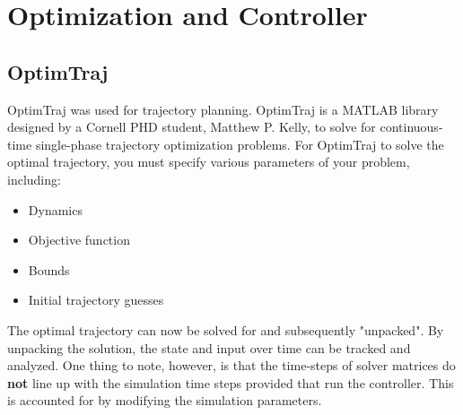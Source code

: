 \documentclass[12pt]{article}
\begin{document}
\section{Optimization and Controller}




\subsection{OptimTraj}

OptimTraj \cite{OptimTraj} was used for trajectory planning. OptimTraj is a MATLAB library designed by a Cornell PHD student, Matthew P. Kelly, to solve for continuous-time single-phase trajectory optimization problems. For OptimTraj to solve the optimal trajectory, you must specify various parameters of your problem, including:
\begin{itemize}
  \item Dynamics
  \item Objective function
  \item Bounds
  \item Initial trajectory guesses
\end{itemize}

The optimal trajectory can now be solved for and subsequently "unpacked". By unpacking the solution, the state and input over time can be tracked and analyzed. One thing to note, however, is that the time-steps of solver matrices do \textbf{not} line up with the simulation time steps provided that run the controller. This is accounted for by modifying the simulation parameters. 
\end{document}
